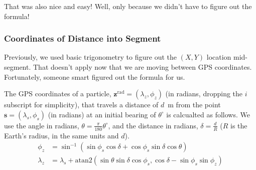 \documentclass[11pt]{article}\usepackage[]{graphicx}\usepackage[]{color}
\newcommand{\bz}{\boldsymbol{z}}
\newcommand{\bs}{\boldsymbol{s}}
\begin{document}
That was also nice and easy! Well, only because we didn't have to figure out the formula!


\subsubsection{Coordinates of Distance into Segment}

Previously, we used basic trigonometry to figure out the $(X,Y)$ location mid-segment. That doesn't
apply now that we are moving between GPS coordinates.
Fortunately, someone smart figured out the formula for us.

The GPS coordinates of a particle, $\bz^{\mathrm{rad}} = (\lambda_z, \phi_z)$ 
(in radians, dropping the $i$ subscript for simplicity), that travels a
distance of $d$~m from the point $\bs = (\lambda_s, \phi_s)$ (in radians) at an initial bearing of $\theta^\circ$
is calcualted as follows.
We use the angle in radians, $\theta = \frac{\pi}{180}\theta^\circ$,
and the distance in radians, $\delta = \frac{d}{R}$ ($R$ is the Earth's radius, in the same units
and $d$).
\begin{align*}
  \phi_z &= 
  \sin^{-1}\left(
    \sin\phi_s \cos\delta + \cos\phi_s \sin\delta \cos\theta
  \right) \\
  \lambda_z &=
  \lambda_s + \mathrm{atan2}\left(
    \sin\theta \sin\delta \cos\phi_s,
    \cos\delta - \sin\phi_s \sin\phi_z
  \right)
\end{align*}
\end{document}
